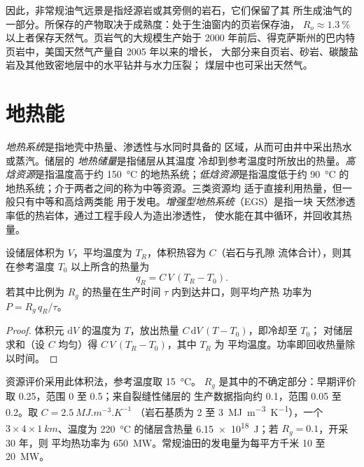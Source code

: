 因此，非常规油气远景是指烃源岩或其旁侧的岩石，它们保留了其
所生成油气的一部分。所保存的产物取决于成熟度：处于生油窗内的页岩保存油，
$R_o \approx \qty{1.3}{\percent}$ 以上者保存天然气。页岩气的大规模生产始于
2000 年前后、得克萨斯州的巴内特页岩中，美国天然气产量自 2005 年以来的增长，
大部分来自页岩、砂岩、碳酸盐岩及其他致密地层中的水平钻井与水力压裂；
煤层中也可采出天然气。

\section{地热能}\label{sec:b2:energy-geology:geothermal}

\begin{definition}\label{def:b2:energy-geology:geothermal}
\emph{地热系统}是指地壳中热量、渗透性与水同时具备的
区域，从而可由井中采出热水或蒸汽。储层的
\emph{地热储量}是指储层从其温度
冷却到参考温度时所放出的热量。\emph{高焓资源}是指温度高于约
\qty{150}{\celsius} 的地热系统；\emph{低焓资源}是指温度低于约
\qty{90}{\celsius} 的地热系统；介于两者之间的称为中等资源。三类资源均
适于直接利用热量，但一般只有中等和高焓两类能
用于发电。\emph{增强型地热系统}（EGS）是指一块
天然渗透率低的热岩体，通过工程手段人为造出渗透性，
使水能在其中循环，并回收其热量。
\end{definition}

\begin{proposition}[地热储量与可采功率]\label{prop:b2:energy-geology:heat}
设储层体积为 $V$，平均温度为 $T_R$，体积热容为 $C$（岩石与孔隙
流体合计），则其在参考温度 $T_0$ 以上所含的热量为
\begin{equation}
q_R = C\,V\,(T_R - T_0) .
\label{eq:b2:energy-geology:heat}
\end{equation}
若其中比例为 $R_g$ 的热量在生产时间 $\tau$ 内到达井口，则平均产热
功率为 $P = R_g\,q_R/\tau$。
\end{proposition}

\begin{proof}
体积元 $\mathrm{d}V$ 的温度为 $T$，放出热量 $C\,\mathrm{d}V\,(T - T_0)$，即冷却至 $T_0$；
对储层求和（设 $C$ 均匀）得 $C\,V\,(T_R - T_0)$，其中 $T_R$ 为
平均温度。功率即回收热量除以时间。
\end{proof}

资源评价采用此体积法，参考温度取 \qty{15}{\celsius}。
$R_g$ 是其中的不确定部分：早期评价取 0.25，范围 0 至 0.5；来自裂缝性储层的
生产数据指向约 0.1，范围 0.05 至 0.2。取 $C = \qty{2.5}{MJ.m^{-3}.K^{-1}}$
（岩石基质为 2 至 \qty{3}{MJ.m^{-3}.K^{-1}}），一个 $3 \times 4 \times
\qty{1}{km}$、温度为 \qty{220}{\celsius} 的储层含热量 \qty{6.15e18}{J}；若 $R_g = 0.1$，开采 30 年，则
平均热功率为 \qty{650}{MW}。常规油田的发电量为每平方千米 10 至
\qty{20}{MW}。

